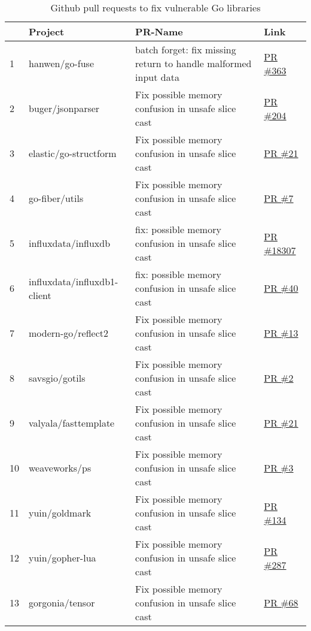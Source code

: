 \begin{table}[h]
    \centering
    \caption{Github pull requests to fix vulnerable Go libraries}
    \label{tbl:pull-requests}
    \begin{tabular}{llll}
        \toprule
        {} & Project & PR-Name & Link \\
        \midrule
        1  & hanwen/go-fuse & batch forget: fix missing return to handle malformed input data & \href{https://www.github.com/hanwen/go-fuse/pull/363}{PR \#363} \\
        2  & buger/jsonparser & Fix possible memory confusion in unsafe slice cast & \href{https://www.github.com/buger/jsonparser/pull/204}{PR \#204} \\
        3  & elastic/go-structform & Fix possible memory confusion in unsafe slice cast & \href{https://github.com/elastic/go-structform/pull/21}{PR \#21} \\
        4  & go-fiber/utils & Fix possible memory confusion in unsafe slice cast & \href{https://github.com/gofiber/utils/pull/7}{PR \#7} \\
        5  & influxdata/influxdb & fix: possible memory confusion in unsafe slice cast & \href{https://github.com/influxdata/influxdb/pull/18307}{PR \#18307} \\
        6  & influxdata/influxdb1-client & fix: possible memory confusion in unsafe slice cast & \href{https://github.com/influxdata/influxdb1-client/pull/40}{PR \#40} \\
        7  & modern-go/reflect2 & Fix possible memory confusion in unsafe slice cast & \href{https://github.com/modern-go/reflect2/pull/13}{PR \#13} \\
        8  & savsgio/gotils & Fix possible memory confusion in unsafe slice cast & \href{https://github.com/savsgio/gotils/pull/2}{PR \#2} \\
        9  & valyala/fasttemplate & Fix possible memory confusion in unsafe slice cast & \href{https://github.com/valyala/fasttemplate/pull/21}{PR \#21} \\
        10 & weaveworks/ps & Fix possible memory confusion in unsafe slice cast & \href{https://github.com/weaveworks/ps/pull/3}{PR \#3} \\
        11 & yuin/goldmark & Fix possible memory confusion in unsafe slice cast & \href{https://github.com/yuin/goldmark/pull/134}{PR \#134} \\
        12 & yuin/gopher-lua & Fix possible memory confusion in unsafe slice cast & \href{https://github.com/yuin/gopher-lua/pull/287}{PR \#287} \\
        13 & gorgonia/tensor & Fix possible memory confusion in unsafe slice cast & \href{https://github.com/gorgonia/tensor/pull/68}{PR \#68} \\
        \bottomrule
    \end{tabular}
\end{table}

